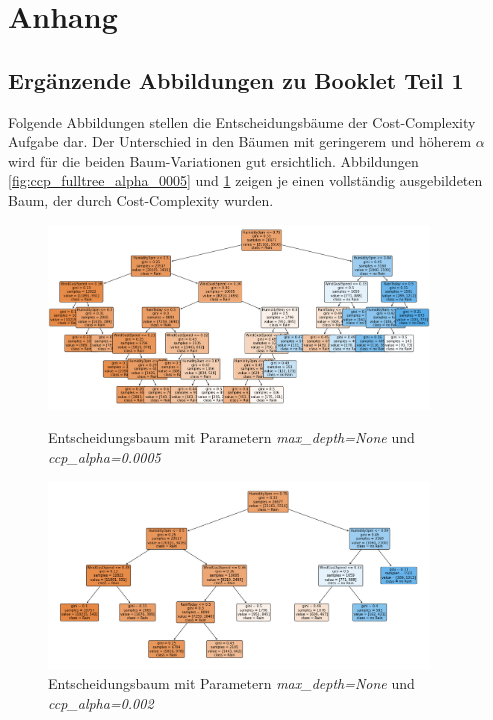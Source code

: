 \pagebreak
{}
\section{Anhang}
\subsection{Ergänzende Abbildungen zu Booklet Teil 1}
\label{app:abb_booklet_1}
Folgende Abbildungen stellen die Entscheidungsbäume der Cost-Complexity Aufgabe dar. Der Unterschied in den Bäumen mit geringerem und höherem $\alpha$ wird für die beiden Baum-Variationen gut ersichtlich. Abbildungen \ref{fig:ccp_fulltree_alpha_0005} und \ref{fig:ccp_fulltree_alpha_002} zeigen je einen vollständig ausgebildeten Baum, der durch Cost-Complexity  wurden.\\
\begin{figure}[H]
    \centering
     \begin{minipage}{0.45\textwidth}
        \centering
        \includegraphics[width=0.9\textwidth]{Bilder/ccp_fulltree_alpha_0005.png}
        \caption{Entscheidungsbaum mit Parametern \emph{max\_depth=None} und \emph{ccp\_alpha=0.0005}}
        \label{fig:ccp_fulltree_alpha_0005}
    \end{minipage}\hfill
    \begin{minipage}{0.45\textwidth}
        \centering
        \includegraphics[width=0.9\textwidth]{Bilder/ccp_fulltree_alpha_002.png}
        \caption{Entscheidungsbaum mit Parametern \emph{max\_depth=None} und \emph{ccp\_alpha=0.002}}
        \label{fig:ccp_fulltree_alpha_002}
    \end{minipage}\hfill
\end{figure}
